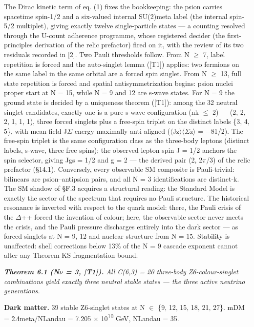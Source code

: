\documentclass[11pt,letterpaper]{article}
\begin{document}
\noindent The Dirac kinetic term of eq. (1) fixes the bookkeeping: the psion carries spacetime spin-1/2 and a six-valued internal SU(2)meta label (the internal spin-5/2 multiplet), giving exactly twelve single-particle states --- a counting resolved through the U-count adherence programme, whose registered decider (the first-principles derivation of the relic prefactor) fired on it, with the review of its two residuals recorded in [2]. Two Pauli thresholds follow. From N $\ge$ 7, label repetition is forced and the auto-singlet lemma ([T1]) applies: two fermions on the same label in the same orbital are a forced spin singlet. From N $\ge$ 13, full state repetition is forced and spatial antisymmetrization begins: psion nuclei proper start at N = 15, while N = 9 and 12 are s-wave states. For N = 9 the ground state is decided by a uniqueness theorem ([T1]): among the 32 neutral singlet candidates, exactly one is a pure s-wave configuration (nk $\le$ 2) --- (2, 2, 2, 1, 1, 1), three forced singlets plus a free-spin triplet on the distinct labels \{3, 4, 5\}, with mean-field J$\Sigma$ energy maximally anti-aligned ($\langle$Jz$\rangle$$\langle$$\Sigma$z$\rangle$ = $-$81/2). The free-spin triplet is the same configuration class as the three-body leptons (distinct labels, s-wave, three free spins); the observed lepton spin J = 1/2 anchors the spin selector, giving Jgs = 1/2 and g = 2 --- the derived pair (2, 2$\pi$/3) of the relic prefactor (§14.1). Conversely, every observable SM composite is Pauli-trivial: bilinears are psion--antipsion pairs, and all N = 3 identifications are distinct-k. The SM shadow of §F.3 acquires a structural reading: the Standard Model is exactly the sector of the spectrum that requires no Pauli structure. The historical resonance is inverted with respect to the quark model: there, the Pauli crisis of the $\Delta$++ forced the invention of colour; here, the observable sector never meets the crisis, and the Pauli pressure discharges entirely into the dark sector --- as forced singlets at N = 9, 12 and nuclear structure from N = 15. Stability is unaffected: shell corrections below 13\% of the N = 9 cascade exponent cannot alter any Theorem KS fragmentation bound.

\noindent \textbf{\textit{Theorem 6.1 (N$\nu$ = 3, [T1]). }}\textit{All C(6,3) = 20 three-body Z6-colour-singlet combinations yield exactly three neutral stable states --- the three active neutrino generations.}

\noindent \textbf{Dark matter. }39 stable Z6-singlet states at N $\in$ \{9, 12, 15, 18, 21, 27\}. mDM = 2$\Lambda$meta/NLandau = 7.205 $\times$ 10\textsuperscript{10} GeV, NLandau = 35.
\end{document}
